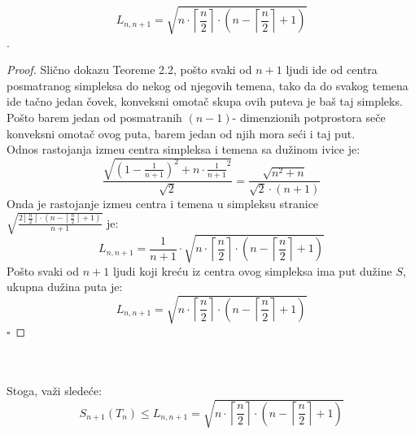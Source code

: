 \documentclass[11pt,letter]{article}
\begin{document}
$$L_{n,n+1}=\sqrt{n\cdot\left\lceil\frac{n}{2}\right\rceil\cdot\left( n-\left\lceil\frac{n}{2}\right\rceil+1\right)}$$.
\\
\smallskip
\begin{proof}
Sli\v cno dokazu Teoreme 2.2, po\v sto svaki od $n+1$ ljudi ide od centra posmatranog simpleksa do nekog od njegovih temena, tako da do svakog temena ide ta\v cno jedan \v covek, konveksni omota\v c skupa ovih puteva je ba\v s taj simpleks. Po\v sto barem jedan od posmatranih $(n-1)$- dimenzionih potprostora se\v ce konveksni omota\v c ovog puta, barem jedan od njih mora se\' ci i taj put. 
\\
 Odnos rastojanja izme\dj u centra simpleksa i temena sa du\v zinom ivice je:
$$\frac{\sqrt{\left( 1-\frac{1}{n+1}\right)^2+n\cdot{\frac{1}{n+1}}^2}}{\sqrt2}=\frac{\sqrt{n^2+n}}{\sqrt2 \cdot(n+1)}$$
\indent Onda je rastojanje izme\dj u centra i temena u simpleksu stranice  $\sqrt{\frac{2\left\lceil \frac{n}{2}\right\rceil\cdot \left( n-\left\lceil\frac{n}{2}\right\rceil+1\right)}{n+1}}$ je:
$$L_{n,n+1}=\frac{1}{n+1}\cdot\sqrt{n\cdot\left\lceil\frac{n}{2}\right\rceil\cdot\left( n-\left\lceil\frac{n}{2}\right\rceil+1\right)}$$
Po\v sto svaki od $n+1$ ljudi koji kre\' cu iz centra ovog simpleksa ima put du\v zine $S$, ukupna du\v zina puta je:
$$L_{n,n+1}=\sqrt{n\cdot\left\lceil\frac{n}{2}\right\rceil\cdot\left( n-\left\lceil\frac{n}{2}\right\rceil +1\right)}$$
$\square$
\end{proof}
\\
\\
Stoga, va\v zi slede\' ce:
$$S_{n+1}(T_n)\leqslant L_{n,n+1}= \sqrt{n\cdot\left\lceil\frac{n}{2}\right\rceil\cdot\left( n-\left\lceil\frac{n}{2}\right\rceil +1\right)}$$
\end{document}

